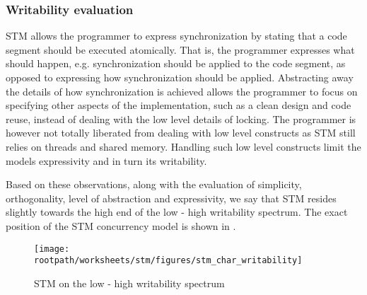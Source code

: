 \subsubsection{Writability evaluation}
\ac{STM} allows the programmer to express synchronization by stating that a code segment should be executed atomically. That is, the programmer expresses what should happen, e.g. synchronization should be applied to the code segment, as opposed to expressing how synchronization should be applied. Abstracting away the details of how synchronization is achieved allows the programmer to focus on specifying other aspects of the implementation, such as a clean design and code reuse, instead of dealing with the low level details of locking. The programmer is however not totally liberated from dealing with low level constructs as \ac{STM} still relies on threads and shared memory. Handling such low level constructs limit the models expressivity and in turn its writability.

Based on these observations, along with the evaluation of simplicity, orthogonality, level of abstraction and expressivity, we say that \ac{STM} resides slightly towards the high end of the low - high writability spectrum. The exact position of the \ac{STM} concurrency model is shown in .

\begin{figure}[htbp]
\centering
 \texttt{[image: \\rootpath/worksheets/stm/figures/stm\_char\_writability]} 
 \caption{\ac{STM} on the low - high writability spectrum}
\label{fig:char_stm_writability}
\end{figure}

\worksheetend
